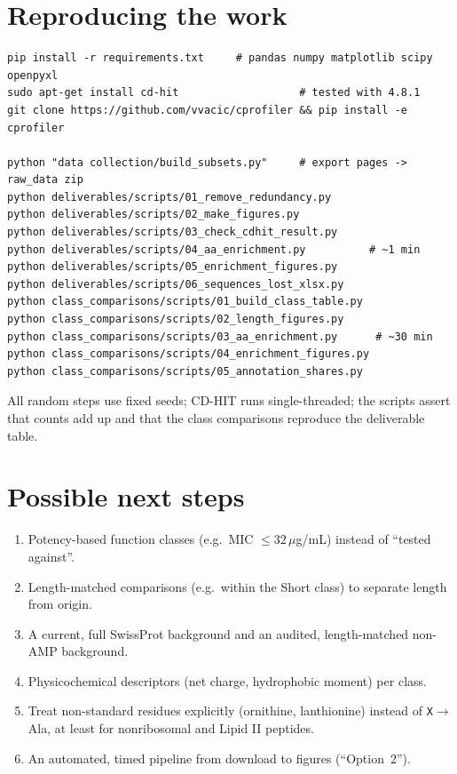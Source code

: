\documentclass[11pt,a4paper]{article}
\begin{document}
\section{Reproducing the work}
\begin{verbatim}
pip install -r requirements.txt     # pandas numpy matplotlib scipy openpyxl
sudo apt-get install cd-hit                   # tested with 4.8.1
git clone https://github.com/vvacic/cprofiler && pip install -e cprofiler

python "data collection/build_subsets.py"     # export pages -> raw_data zip
python deliverables/scripts/01_remove_redundancy.py
python deliverables/scripts/02_make_figures.py
python deliverables/scripts/03_check_cdhit_result.py
python deliverables/scripts/04_aa_enrichment.py          # ~1 min
python deliverables/scripts/05_enrichment_figures.py
python deliverables/scripts/06_sequences_lost_xlsx.py
python class_comparisons/scripts/01_build_class_table.py
python class_comparisons/scripts/02_length_figures.py
python class_comparisons/scripts/03_aa_enrichment.py      # ~30 min
python class_comparisons/scripts/04_enrichment_figures.py
python class_comparisons/scripts/05_annotation_shares.py
\end{verbatim}
All random steps use fixed seeds; CD-HIT runs single-threaded; the scripts assert that counts add up and that the class comparisons reproduce the deliverable table.

\section{Possible next steps}
\begin{enumerate}
\item Potency-based function classes (e.g.\ MIC $\leq 32\,\mu$g/mL) instead of ``tested against''.
\item Length-matched comparisons (e.g.\ within the Short class) to separate length from origin.
\item A current, full SwissProt background and an audited, length-matched non-AMP background.
\item Physicochemical descriptors (net charge, hydrophobic moment) per class.
\item Treat non-standard residues explicitly (ornithine, lanthionine) instead of \texttt{X}$\rightarrow$Ala, at least for nonribosomal and Lipid II peptides.
\item An automated, timed pipeline from download to figures (``Option~2'').
\end{enumerate}
\end{document}
